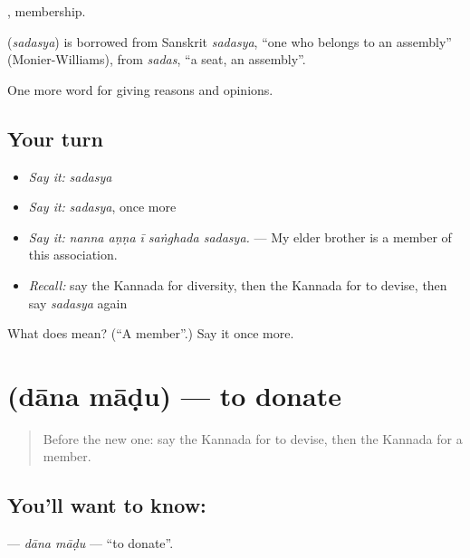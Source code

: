 , membership.

\begin{cousinweb}
\textbf{} (\emph{sadasya}) is borrowed from Sanskrit \emph{sadasya}, \textquotedblleft{}one who belongs to an assembly\textquotedblright{} (Monier-Williams), from \emph{sadas}, \textquotedblleft{}a seat, an assembly\textquotedblright{}.
\end{cousinweb}

\begin{grammarlens}[title={What you've built}]
One more word for giving reasons and opinions.
\end{grammarlens}

\subsection*{Your turn}
\begin{itemize}
\raggedright
  \item \emph{Say it:} \emph{sadasya}
  \item \emph{Say it:} \emph{sadasya}, once more
  \item \emph{Say it:} \emph{nanna aṇṇa ī saṅghada sadasya.} — My elder brother is a member of this association.
  \item \emph{Recall:} say the Kannada for diversity, then the Kannada for to devise, then say \emph{sadasya} again
\end{itemize}

\begin{tcolorbox}[breakable,colback=teal!4,colframe=teal!35!black,title={Before you move on}]
What does  mean? (\textquotedblleft{}A member\textquotedblright{}.) Say it once more.
\end{tcolorbox}
\section[\texorpdfstring{\kn{ದಾನ} \kn{ಮಾಡು} (dāna māḍu)}{ದಾನ ಮಾಡು (dāna māḍu)}]{  (dāna māḍu) — to donate}

\label{lesson:KA-C404-dana-madu}



\begin{quote}
Before the new one: say the Kannada for to devise, then the Kannada for a member.
\end{quote}

\subsection*{You'll want to know:  }
\textbf{ } — \emph{dāna māḍu} — \textquotedblleft{}to donate\textquotedblright{}.

